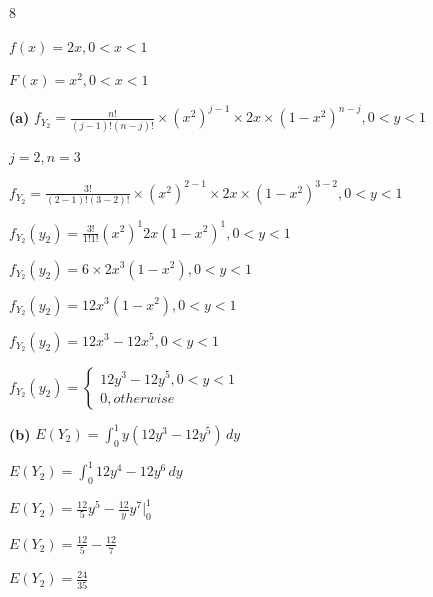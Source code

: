 \documentclass[12 pt]{article}
\begin{document}
    \begin{exercise}{8}
    \hfill

    $f(x) = 2x, 0 < x < 1$

    $F(x) = x^2, 0< x < 1$

    \hfill

    \textbf{(a)} $f_{Y_2} = \frac{n!}{(j-1)!(n-j)!} \times (x^2)^{j-1} \times 2x \times (1-x^2)^{n-j}, 0 < y < 1$

    $j=2, n=3$

    $f_{Y_2} = \frac{3!}{(2-1)!(3-2)!} \times (x^2)^{2-1} \times 2x \times (1-x^2)^{3-2}, 0 < y < 1$

    $f_{Y_2}(y_2) = \frac{3!}{1!1!}(x^2)^1 2x (1-x^2)^1, 0 < y < 1$

    $f_{Y_2}(y_2) = 6 \times 2x^3 (1-x^2), 0 < y < 1$

    $f_{Y_2}(y_2) = 12x^3 (1-x^2), 0 < y < 1$

    $f_{Y_2}(y_2) = 12x^3 - 12x^5, 0 < y < 1$

    $f_{Y_2}(y_2) = \begin{cases}
        12y^3 - 12y^5, 0 < y < 1 \\
        0, otherwise
    \end{cases}$

    \hfill

    \textbf{(b)} $E(Y_2) = \int_{0}^{1} y (12y^3 - 12y^5) \, dy$

    $E(Y_2) = \int_{0}^{1} 12y^4 - 12y^6 \, dy$

    $E(Y_2) = \frac{12}{5}y^5 - \frac{12}{y}y^7 |_{0}^{1}$

    $E(Y_2) = \frac{12}{5} - \frac{12}{7}$

    $E(Y_2) = \frac{24}{35}$

    \hfill
    \end{exercise}
\end{document}
